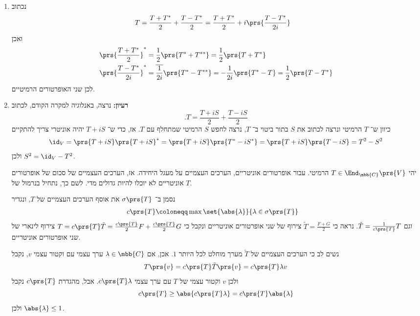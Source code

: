 \documentclass[a4paper,10pt,twoside,openany]{book}
\begin{document}
\begin{solution}
\begin{enumerate}
    \item נכתוב
    \begin{align*}
        T &= \frac{T + T^*}{2} + \frac{T - T^*}{2} = \frac{T + T^*}{2} + i \prs{\frac{T - T^*}{2i}}
    \end{align*}
    ואכן
    \begin{align*}
        \prs{\frac{T+T^*}{2}}^* &= \frac{1}{2} \prs{T^* + T^{**}} = \frac{1}{2} \prs{T + T^*} \\
        \prs{\frac{T - T^*}{2i}}^* &= \overline{\frac{1}{2i}} \prs{T^* - T^{**}} = -\frac{1}{2i} \prs{T^* - T} = \frac{1}{2} \prs{T - T^*}
    \end{align*}
    לכן שני האופרטורים הרמיטיים.

    \item
    \textbf{רעיון:}
    נרצה, באנלוגיה למקרה הקודם, לכתוב
    \[\text{.} T = \frac{T + i S}{2} + \frac{T - i S}{2}\]
    כיוון ש־%
    $T$
    הרמיטי ונרצה לכתוב את
    $S$
    בתור ביטוי ב־%
    $T$,
    נרצה לחפש
    $S$
    הרמיטי שמתחלף עם
    $T$.
    אז, כדי ש־%
    $T + i S$
    יהיה אוניטרי צריך להתקיים
\[\id_V = \prs{T+iS}\prs{T+iS}^* = \prs{T+iS}\prs{T^* - i S^*} = \prs{T+iS}\prs{T-iS} = T^2 - S^2\]
    ולכן
    $S^2 = \id_V - T^2$.
    
    יהי
    $T \in \End_{\mbb{C}}\prs{V}$
    הרמיטי.
    עבור אופרטורים אוניטריים, הערכים העצמיים על מעגל היחידה. אז, הערכים העצמיים של סכום של אופרטורים אוניטריים לא יוכלו להיות גדולים מדי. לשם כך, נתחיל בנרמול של
    $T$.
    
    נסמן ב־%
    $\sigma\prs{T}$
    את אוסף הערכים העצמיים של
    $T$,
    ונגדיר
    \begin{align*}
        c\prs{T} &\coloneqq \max\set{\abs{\lambda}}{\lambda \in \sigma\prs{T}}
    \end{align*}
    וגם
    $\tilde{T} = \frac{1}{c\prs{T}} T$.
    נראה כי
    $\tilde{T} = \frac{F + G}{2}$
    צירוף של שני אופרטורים אוניטריים ונקבל כי
    $T = c\prs{T} \tilde{T} = \frac{c\prs{T}}{2} F + \frac{c\prs{T}}{2} G$
    צירוף לינארי של שני אופרטורים אוניטריים.
    
    נשים לב כי הערכים העצמיים של
    $\tilde{T}$
    מערך מוחלט לכל היותר
    $1$.
    אכן, אם
    $\lambda \in \mbb{C}$
    ערך עצמי עם וקטור עצמי
    $v$,
    נקבל
    \[T\prs{v} = c\prs{T} \tilde{T}\prs{v} = c\prs{T} \lambda v\]
    ולכן
    $v$
    וקטור עצמי של
    $T$
    עם ערך עצמי
    $c\prs{T} \lambda$.
    אבל, מהגדרת
    $c\prs{T}$
    נקבל
    \[c\prs{T} \geq \abs{c\prs{T} \lambda} = c\prs{T} \abs{\lambda}\]
    ולכן
    $\abs{\lambda} \leq 1$.
    

\end{enumerate}
\end{solution}
\end{document}
